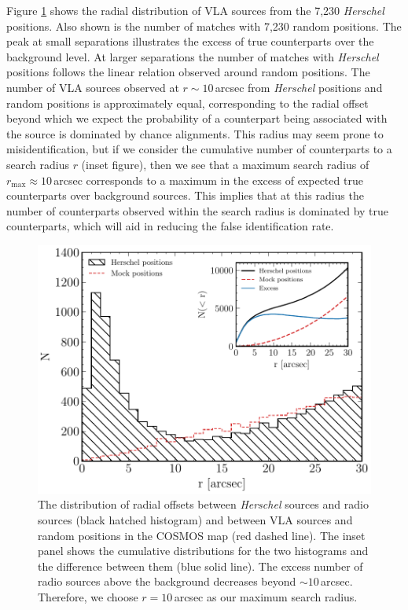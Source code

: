 Figure \ref{fig:optimal_radius} shows the radial distribution of VLA sources from the 7,230 \textit{Herschel} positions. Also shown is the number of matches with 7,230 random positions. The peak at small separations illustrates the excess of true counterparts over the background level. At larger separations the number of matches with \textit{Herschel} positions follows the linear relation observed around random positions. The number of VLA sources observed at $r \sim 10$\,arcsec from \textit{Herschel} positions and random positions is approximately equal, corresponding to the radial offset beyond which we expect the probability of a counterpart being associated with the source is dominated by chance alignments. This radius may seem prone to misidentification, but if we consider the cumulative number of counterparts to a search radius $r$ (inset figure), then we see that a maximum search radius of $r_{\textrm{max}} \approx 10$\,arcsec corresponds to a maximum in the excess of expected true counterparts over background sources. This implies that at this radius the number of counterparts observed within the search radius is dominated by true counterparts, which will aid in reducing the false identification rate.

\begin{figure}
	\centering
	\includegraphics[width=0.75\columnwidth]{Figures/optimal_radius.pdf}
	\caption[Distribution of radial offsets between \textit{Herschel} sources and radio objects]{The distribution of radial offsets between \textit{Herschel} sources and radio sources (black hatched histogram) and between VLA sources and random positions in the COSMOS map (red dashed line). The inset panel shows the cumulative distributions for the two histograms and the difference between them (blue solid line). The excess number of radio sources above the background decreases beyond $\sim10\,$arcsec. Therefore, we choose $r = 10\,$arcsec as our maximum search radius.}
	\label{fig:optimal_radius}
\end{figure}

